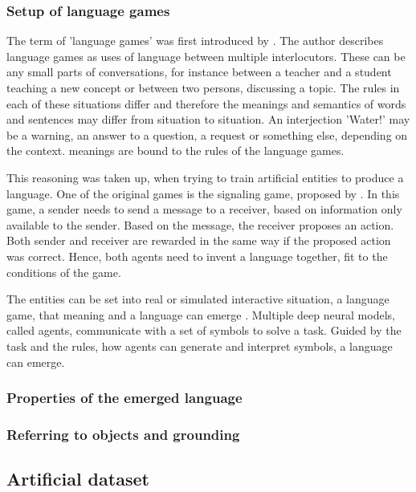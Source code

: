 \subsubsection{Setup of language games}
\label{sec:setup-lg}
The term of 'language games' was first introduced by \citet{Wittgenstein1953}.
The author describes language games as uses of language between multiple interlocutors.
These can be any small parts of conversations, for instance between a teacher and a student teaching a new concept or between two persons, discussing a topic.
The rules in each of these situations differ and therefore the meanings and semantics of words and sentences may differ from situation to situation.
An interjection 'Water!' may be a warning, an answer to a question, a request or something else, depending on the context.
meanings are bound to the rules of the language games.

This reasoning was taken up, when trying to train artificial entities to produce a language.
One of the original games is the signaling game, proposed by \citet{Lewis1969}.
In this game, a sender needs to send a message to a receiver, based on information only available to the sender.
Based on the message, the receiver proposes an action.
Both sender and receiver are rewarded in the same way if the proposed action was correct.
Hence, both agents need to invent a language together, fit to the conditions of the game.

The entities can be set into real or simulated interactive situation, a language game, that meaning and a language can emerge \citep{Kirby2002}.
Multiple deep neural models, called agents, communicate with a set of symbols to solve a task.
Guided by the task and the rules, how agents can generate and interpret symbols, a language can emerge.


\subsubsection{Properties of the emerged language}
\label{sec:properties-el}


\subsubsection{Referring to objects and grounding}
\label{sec:referring}

\subsection{Artificial dataset}
